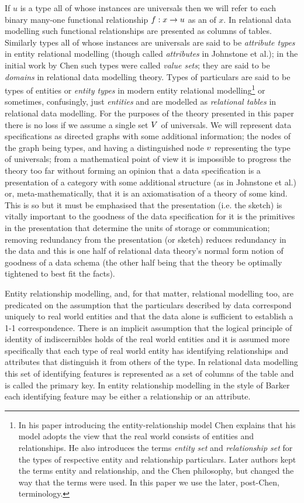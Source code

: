 If $u$ is a type all of whose instances are universals then we will refer to each binary many-one functional relationship $f: x \rightarrow u$ as an  of $x$. In relational data modelling such functional relationships are presented as columns of tables. Similarly types all of whose instances are universals  are said to be \textit{attribute types} in entity relational modelling  (though called \textit{attributes} in Johnstone et al.); in the initial work by Chen such types were called \textit{value sets}; they are said to be \textit{domains} in relational data modelling theory. Types of particulars are said to be types of entities or \textit{entity types} in modern entity relational modelling\footnote{In  his paper  introducing the entity-relationship model Chen explains that his model adopts the view that the real world consists of entities and relationships. He also introduces the  terms \textit{entity set} and \textit{relationship set} for the types of respective entity and relationship particulars. Later authors kept the terms entity and relationship, and the Chen philosophy, but changed the way that the terms were used. In this paper we use the later, post-Chen, terminology.} or sometimes, confusingly, just \textit{entities}  and are modelled as \textit{relational tables} in relational data modelling. For the purposes of the theory presented in this paper there is no loss if we assume a single set $V$ of universals.  We will represent data specifications as directed graphs with some additional information; the nodes of the graph being types, and having a distinguished node $v$ representing the type of universals; from a mathematical point of view it is impossible to progress the theory too far without forming an opinion that a data specification is a presentation of a category with some additional structure (as in Johnstone et al.) or, meta-mathematically, that it is an axiomatisation of a theory of some kind. This is so but it must be emphasised that the presentation (i.e. the sketch) is vitally important to the goodness of the data specification for it is the primitives in the presentation that determine the units of storage or communication; removing redundancy from the presentation (or sketch) reduces redundancy in the data and this is one half of relational data theory's  normal form notion of goodness of a data schema (the other half being that the theory be optimally tightened to best fit the facts).

Entity relationship modelling, and, for that matter, relational modelling too, are predicated on the assumption that the particulars described by data correspond uniquely to real world entities and that the data alone is sufficient to establish a 1-1 correspondence. There is an implicit assumption that the logical principle of identity of indiscernibles holds of the real world entities and it is assumed more specifically that each type of real world entity has identifying relationships and attributes that distinguish it from  others of the type. In relational data modelling this set of identifying features is represented as a set of columns of the table and is called the primary key. In entity relationship modelling in the style of Barker each identifying feature may be either a relationship or an attribute.   

